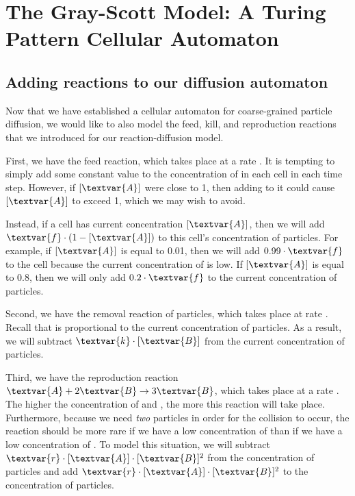\FloatBarrier
{}
\section{The Gray-Scott Model: A Turing Pattern Cellular Automaton}
\label{sec:the_gray-scott_model:_a_turing_pattern_cellular_automaton}

\FloatBarrier
{}
\subsection{Adding reactions to our diffusion automaton}

Now that we have established a cellular automaton for coarse-grained particle diffusion, we would like to also model the feed, kill, and reproduction reactions that we introduced for our reaction-diffusion model.\\

\begin{qbox}\end{qbox}

First, we have the feed reaction, which takes place at a rate . It is tempting to simply add some constant value  to the concentration of  in each cell in each time step. However, if $[\textvar{A}]$ were close to 1, then adding  to it could cause $[\textvar{A}]$ to exceed 1, which we may wish to avoid.

Instead, if a cell has current concentration $[\textvar{A}]$, then we will add $\textvar{f} \cdot (1-[\textvar{A}])$ to this cell's concentration of  particles. For example, if $[\textvar{A}]$ is equal to 0.01, then we will add $0.99 \cdot \textvar{f}$ to the cell because the current concentration of is low. If $[\textvar{A}]$ is equal to 0.8, then we will only add $0.2 \cdot \textvar{f}$ to the current concentration of  particles.

Second, we have the removal reaction of  particles, which takes place at rate . Recall that  is proportional to the current concentration of  particles. As a result, we will subtract $\textvar{k} \cdot [\textvar{B}]$ from the current concentration of  particles.

Third, we have the reproduction reaction $\textvar{A} + 2\textvar{B} \rightarrow 3\textvar{B}$, which takes place at a rate . The higher the concentration of  and , the more this reaction will take place. Furthermore, because we need \textit{two}  particles in order for the collision to occur, the reaction should be more rare if we have a low concentration of  than if we have a low concentration of . To model this situation, we will subtract $\textvar{r} \cdot [\textvar{A}] \cdot [\textvar{B}]^2$ from the concentration of  particles and add $\textvar{r} \cdot [\textvar{A}] \cdot [\textvar{B}]^2$ to the concentration of  particles.

